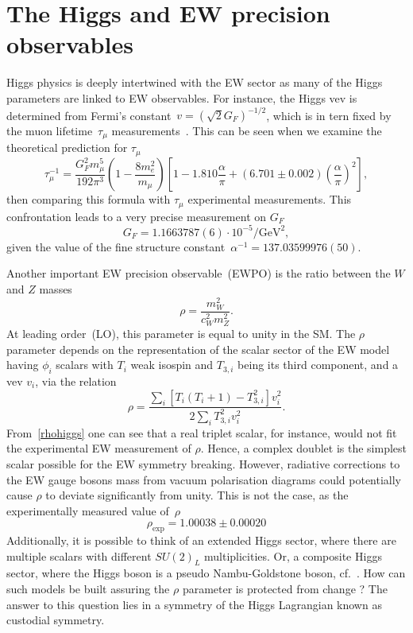 \section{The Higgs and EW precision observables}
\par Higgs physics is deeply intertwined with the EW sector as many of the Higgs parameters are linked to EW observables. For instance, the Higgs vev is determined from Fermi's constant~$v =(\sqrt{2}G_F)^{-1/2}$, which is in tern fixed by the muon lifetime~$ \tau_\mu$ measurements~\cite{PhysRev.101.866,PhysRev.113.1652,Mohammad:1976qd,PhysRevLett.82.488}. This can be seen when we examine the theoretical prediction for $ \tau_\mu$ 
\begin{equation}
    \tau_\mu^{-1} = \frac{G_F^2 m_\mu^5}{192\pi^3}\left(1-\frac{8 m_e^2}{m_\mu}\right) \left[1-1.810\frac{\alpha}{\pi}+(6.701\pm0.002)\left(\frac{\alpha}{\pi}\right)^2\right],
\end{equation}
then comparing this formula with $ \tau_\mu$  experimental measurements. This confrontation leads to a very precise measurement on $G_F$~\cite{Zyla:2020zbs}
\begin{equation}
    G_F=1.1663787(6) \cdot 10^{-5} \si{\per\GeV\squared},
\end{equation}
given the value of the fine structure constant~$\alpha^{-1} =137.03599976 (50)$. 
\par Another important EW precision observable~(EWPO) is the ratio between the $W$ and $Z$ masses
\begin{equation}
    \rho = \frac{m_W^2}{c_W^2m_Z^2}.
\end{equation}
At leading order~(LO), this parameter is equal to unity in the SM. The $\rho$ parameter depends on the representation of the scalar sector of the EW model having $\phi_i$ scalars with $T_i$ weak isospin and $T_{3,i}$ being its third component, and a vev $v_i$, via the relation~\cite{ROSS1975135,Djouadi:2005gi}
\begin{equation}
    \rho =\frac{\sum_i [T_{i}(T_{i}+1)-T_{3,i}^2]v_i^2}{2\sum_i T_{3,i}^2v_i^2}.
    \label{rhohiggs}
\end{equation}
From~\eqref{rhohiggs} one can see that a real triplet scalar, for instance, would not fit the experimental EW measurement of $\rho$. Hence, a complex doublet is the simplest scalar possible for the EW symmetry breaking. However, radiative corrections to the EW gauge bosons mass from vacuum polarisation diagrams could potentially cause $\rho$ to deviate significantly from unity.  This is not the case, as the experimentally measured value of~$\rho$~\cite{Zyla:2020zbs}
\begin{equation}
    \rho_{\text{exp}} = 1.00038 \pm 0.00020
    \label{eq:rhoexp}
\end{equation}
Additionally, it is possible to think of an extended Higgs sector, where there are multiple scalars with different $SU(2)_L$ multiplicities. Or, a composite Higgs sector, where the Higgs boson is a pseudo Nambu-Goldstone boson, cf.~\cite{Dugan1985AnatomyOA,Hill:2002ap}. How can such models be built assuring the $\rho$ parameter is protected from change ? The answer to this question lies in a symmetry of the Higgs Lagrangian known as custodial symmetry. 
